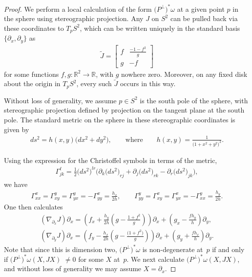 \documentclass[pdftex]{sigma}
\numberwithin{equation}{section}
\newcommand{\R}{\mathbb{R}}
\begin{document}
\begin{proof}We perform a local calculation of the form $\big(P^\perp\big)^*\omega$ at a given point $p$ in the sphere using stereographic projection. Any $J$ on $S^2$ can be pulled back via these coordinates to $T_pS^2$, which can be written uniquely in the standard basis $\{\partial_x , \partial_y\}$ as
\begin{gather*}
\tilde J=
\begin{bmatrix}
f & \frac{-1-f^2}{g}\\
g & -f
\end{bmatrix}
\end{gather*}
for some functions $f,g\colon \R^2 \to \R$, with $g$ nowhere zero. Moreover, on any fixed disk about the origin in $T_pS^2$, every such $\tilde J$ occurs in this way.

Without loss of generality, we assume $p\in S^2$ is the south pole of the sphere, with stereographic projection defined by projection on the tangent plane at the south pole. The standard metric on the sphere in these stereographic coordinates is given by
\begin{gather*}
ds^2 = h(x,y) \big(dx^2 + dy^2\big), \qquad \textrm{where} \qquad h(x,y) = \frac{1}{\big(1+x^2 +y^2\big)^2}.
\end{gather*}

Using the expression for the Christoffel symbols in terms of the metric,
\begin{gather*}
\Gamma_{jk}^\ell = \frac 1 2 \big(ds^2\big)^{lr} \big( \partial_k \big(ds^2\big)_{rj} + \partial_j \big(ds^2\big)_{rk} - \partial_r \big(ds^2\big)_{jk} \big),
\end{gather*}
we have
\begin{gather*}
\Gamma_{xx}^x = \Gamma_{xy}^y = \Gamma_{yx}^y = - \Gamma_{yy}^x = \frac{h_x}{2h}, \qquad
\Gamma_{yy}^y = \Gamma_{xy}^x = \Gamma_{yx}^x = - \Gamma_{xx}^y = \frac{h_y}{2h}.
\end{gather*}
One then calculates
\begin{gather}
( \nabla_{\partial_x} J ) \partial_x= \left(f_x + \frac{h_y}{2h} \left( g- \frac{1+f^2}{g} \right) \right) \partial_x +
\left(g_x - \frac{f h_y}{h}\right) \partial_y, \label{eqn;NJ1} \\
( \nabla_{\partial_y} J ) \partial_x = \left(f_y - \frac{h_x}{2h} \left( g - \frac{ \big(1+f^2 \big) }{g} \right) \right) \partial_x + \left(g_y + \frac{f h_x}{h}\right) \partial_y. \label{eqn;NJ2}
\end{gather}
Note that since this is dimension two, $\big(P^\perp\big)^*\!\omega$ is non-degenerate at~$p$ if and only if $\big(P^\perp\big)^*\!\omega(X,JX)\!$ $\neq 0$ for some $X$ at~$p$. We next calculate $\big(P^\perp\big)^*\omega(X,JX)$, and without loss of generality we may assume $X= \partial_x$.


\end{proof}
\end{document}
